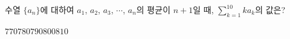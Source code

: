 수열 $\{a_n\}$에 대하여 $a_1$, $a_2$, $a_3$, $\cdots$, $a_n$의 평균이 $n+1$일 때, $\displaystyle\sum_{k=1}^{10}ka_k$의 값은?
\begin{choices32}{$770$}{$780$}{$790$}{$800$}{$810$}\end{choices32}
